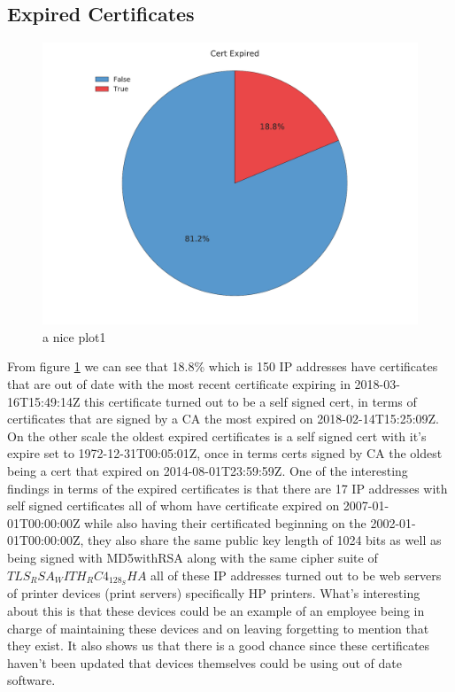 \documentclass[a4wide,leqno,12pt]{report}
\begin{document}
\subsection{Expired Certificates}
\begin{figure}[H]
\centering
\includegraphics[scale=.5]{pdf_images/CertificateExpired}
\caption{a nice plot1}
\label{fig:certExpired}
\end{figure}

From figure \ref{fig:certExpired} we can see that 18.8\% which is 150 IP addresses have certificates that are out of date with the most recent certificate expiring in 2018-03-16T15:49:14Z this certificate turned out to be a self signed cert, in terms of certificates that are signed by a CA the most expired on 2018-02-14T15:25:09Z. On the other scale the oldest expired certificates is a self signed cert with it's expire set to 1972-12-31T00:05:01Z, once in terms certs signed by CA the oldest being a cert that expired on 2014-08-01T23:59:59Z. One of the interesting findings in terms of the expired certificates is that there are 17 IP addresses with self signed certificates all of whom have certificate expired on 2007-01-01T00:00:00Z while also having their certificated beginning on the 2002-01-01T00:00:00Z, they also share the same public key length of 1024 bits as well as being signed with MD5withRSA along with the same cipher suite of $TLS_RSA_WITH_RC4_128_SHA$ all of these IP addresses turned out to be web servers of printer devices (print servers) specifically HP printers. What's interesting about this is that these devices could be an example of an employee being in charge of maintaining these devices and on leaving forgetting to mention that they exist. It also shows us that there is a good chance since these certificates haven't been updated that devices themselves could be using out of date software.
\end{document}
